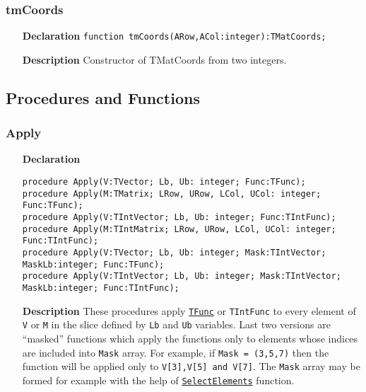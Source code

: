 \documentclass[12pt,a4paper,oneside]{report}
\newcommand{\declarationitem}[1]{\textbf{#1}}
\newcommand{\descriptiontitle}[1]{\textbf{#1}}
\newcommand{\code}[1]{\texttt{#1}}
\begin{document}
\subsubsection{tmCoords}
\begin{itemize}\label{uvecutils:tmcoords}
\item[\declarationitem{Declaration}\hfill]
\code{function tmCoords(ARow,ACol:integer):TMatCoords;}
\item[\descriptiontitle{Description}]
Constructor of TMatCoords from two integers.
\end{itemize}
\subsection{Procedures and Functions}
\subsubsection{Apply}
\label{uvecutils:apply}
\begin{itemize}
	\item[\declarationitem{Declaration}\hfill]
\begin{flushleft}	\code{procedure Apply(V:TVector; Lb, Ub: integer; Func:TFunc);\\ \vspace{4pt}
	procedure Apply(M:TMatrix; LRow, URow, LCol, UCol: integer; Func:TFunc); \\ \vspace{4pt}
	procedure Apply(V:TIntVector; Lb, Ub: integer; Func:TIntFunc);\\ \vspace{4pt}
	procedure Apply(M:TIntMatrix; LRow, URow, LCol, UCol: integer; Func:TIntFunc);\\ \vspace{6pt}
	procedure Apply(V:TVector; Lb, Ub: integer; Mask:TIntVector; MaskLb:integer; Func:TFunc);\\ \vspace{4pt}
	procedure Apply(V:TIntVector; Lb, Ub: integer; Mask:TIntVector; MaskLb:integer; Func:TIntFunc);}
\end{flushleft}	\item[\descriptiontitle{Description}]
	These procedures apply \hyperref[utypes-TFunc]{\code{TFunc}} or \code{TIntFunc} to every element of \code{V} or \code{M} in the slice defined by \code{Lb} and \code{Ub} variables. Last two versions are ``masked'' functions which apply the functions only to elements whose indices are included into \code{Mask} array.
	For example, if \code{Mask = (3,5,7)} then the function will be applied only to \code{V[3],V[5] and V[7]}. The \code{Mask} array may be formed for example with the help of \hyperref[uvecutils:SelElements]{\code{SelectElements}} function.
\end{itemize}
\end{document}

